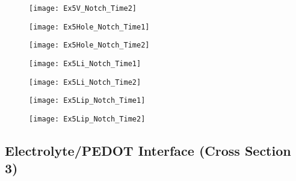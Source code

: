 \begin{landscape}
\begin{figure}[!htp]
\centering
\texttt{[image: Ex5V\_Notch\_Time2]}
\caption{} 
\label{}
\end{figure}
\end{landscape}


\begin{landscape}
\begin{figure}[!htp]
\centering
\texttt{[image: Ex5Hole\_Notch\_Time1]}
\caption{} 
\label{}
\end{figure}
\end{landscape}

\begin{landscape}
\begin{figure}[!htp]
\centering
\texttt{[image: Ex5Hole\_Notch\_Time2]}
\caption{} 
\label{}
\end{figure}
\end{landscape}

\begin{landscape}
\begin{figure}[!htp]
\centering
\texttt{[image: Ex5Li\_Notch\_Time1]}
\caption{} 
\label{}
\end{figure}
\end{landscape}

\begin{landscape}
\begin{figure}[!htp]
\centering
\texttt{[image: Ex5Li\_Notch\_Time2]}
\caption{} 
\label{}
\end{figure}
\end{landscape}

\begin{landscape}
\begin{figure}[!htp]
\centering
\texttt{[image: Ex5Lip\_Notch\_Time1]}
\caption{} 
\label{}
\end{figure}
\end{landscape}

\begin{landscape}
\begin{figure}[!htp]
\centering
\texttt{[image: Ex5Lip\_Notch\_Time2]}
\caption{} 
\label{}
\end{figure}
\end{landscape}

\clearpage
\subsection{Electrolyte/PEDOT Interface (Cross Section 3) }


